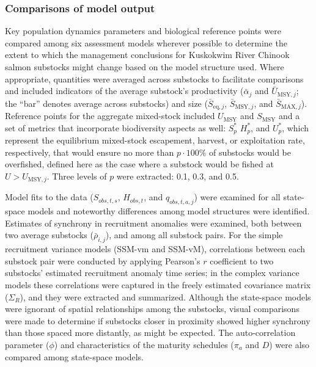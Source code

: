 \documentclass[12pt,]{book}
\theoremstyle{definition}
\theoremstyle{definition}
\theoremstyle{definition}
\theoremstyle{remark}
\begin{document}
\subsubsection{Comparisons of model
output}\label{comparisons-of-model-output}

\noindent
Key population dynamics parameters and biological reference points were
compared among six assessment models wherever possible to determine the
extent to which the management conclusions for Kuskokwim River Chinook
salmon substocks might change based on the model structure used. Where
appropriate, quantities were averaged across substocks to facilitate
comparisons and included indicators of the average substock's
productivity (\(\bar{\alpha}_j\) and \(\bar{U}_{\text{MSY},j}\); the
``bar'' denotes average across substocks) and size
(\(\bar{S}_{\text{eq},j}\), \(\bar{S}_{\text{MSY},j}\), and
\(\bar{S}_{\text{MAX},j}\)). Reference points for the aggregate
mixed-stock included \(U_{\text{MSY}}\) and \(S_{\text{MSY}}\) and a set
of metrics that incorporate biodiversity aspects as well: \(S^*_p\)
\(H^*_p\), and \(U^*_p\), which represent the equilibrium mixed-stock
escapement, harvest, or exploitation rate, respectively, that would
ensure no more than \(p \cdot 100\%\) of substocks would be overfished,
defined here as the case where a substock would be fished at
\(U > U_{\text{MSY},j}\). Three levels of \(p\) were extracted: 0.1,
0.3, and 0.5.

Model fits to the data (\(S_{obs,t,s}\), \(H_{obs,t}\), and
\(q_{obs,t,a,j}\)) were examined for all state-space models and
noteworthy differences among model structures were identified. Estimates
of synchrony in recruitment anomalies were examined, both between two
average substocks (\(\bar{\rho}_{i,j}\)), and among all substock pairs.
For the simple recruitment variance models (SSM-vm and SSM-vM),
correlations between each substock pair were conducted by applying
Pearson's \(r\) coefficient to two substocks' estimated recruitment
anomaly time series; in the complex variance models these correlations
were captured in the freely estimated covariance matrix (\(\Sigma_R\)),
and they were extracted and summarized. Although the state-space models
were ignorant of spatial relationships among the substocks, visual
comparisons were made to determine if substocks closer in proximity
showed higher synchrony than those spaced more distantly, as might be
expected. The auto-correlation parameter (\(\phi\)) and characteristics
of the maturity schedules (\(\pi_a\) and \(D\)) were also compared among
state-space models.
\end{document}
